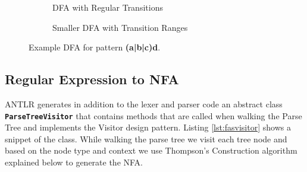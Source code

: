 \begin{figure}[htpb]
\begin{subfigure}[b]{\textwidth}
\centering
{}
\caption{DFA with Regular Transitions}
\label{fig:automatonrangea}
\end{subfigure}
\par\bigskip
\begin{subfigure}[b]{\textwidth}
\centering
{}
\caption{Smaller DFA with Transition Ranges}
\label{fig:automatonrangeb}

\end{subfigure}
\caption{Example DFA for pattern \textbf{(a|b|c)d}.}\label{fig:automatonrange}
\end{figure}

\subsection{Regular Expression to NFA}\label{subsection:regexnfa}
ANTLR generates in addition to the lexer and parser code an abstract class \texttt{\textbf{ParseTreeVisitor}} that contains methods that are called when walking the Parse Tree and implements the Visitor design pattern. Listing \ref{lst:fasvisitor} shows a snippet of the class. While walking the parse tree we visit each tree node and based on the node type and context we use Thompson's Construction algorithm explained below to generate the NFA.

